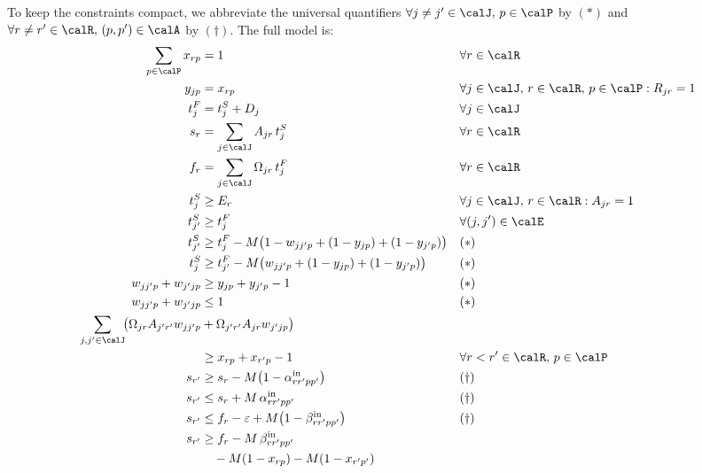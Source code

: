 To keep the constraints compact, we abbreviate the universal quantifiers
$\forall j \ne j' \in \calJ,\, p \in \calP$ by $(\ast)$ and
$\forall r \ne r' \in \calR,\, (p, p') \in \calA$ by $(\dagger)$.
The full model is:
\begin{align}
  \sum_{p \in \calP} x_{rp} &= 1
    && \forall r \in \calR \label{eq:assign}\\
  y_{jp} &= x_{rp}
    && \forall j \in \calJ,\, r \in \calR,\, p \in \calP : R_{jr} = 1
    \label{eq:linkage}\\
  t^F_j &= t^S_j + D_j
    && \forall j \in \calJ \label{eq:finish}\\
  s_r &= \sum_{j \in \calJ} A_{jr}\, t^S_j
    && \forall r \in \calR \label{eq:srdef}\\
  f_r &= \sum_{j \in \calJ} \Omega_{jr}\, t^F_j
    && \forall r \in \calR \label{eq:frdef}\\
  t^S_j &\ge E_r
    && \forall j \in \calJ,\, r \in \calR : A_{jr} = 1
    \label{eq:earlystart}\\
  t^S_{j'} &\ge t^F_j
    && \forall (j, j') \in \calE \label{eq:prec}\\
  t^S_{j'} &\ge t^F_j
              - M\bigl(1 - w_{jj'p} + (1 - y_{jp}) + (1 - y_{j'p})\bigr)
    && (\ast) \label{eq:nonov1}\\
  t^S_{j}  &\ge t^F_{j'}
              - M\bigl(w_{jj'p} + (1 - y_{jp}) + (1 - y_{j'p})\bigr)
    && (\ast) \label{eq:nonov2}\\
  w_{jj'p} + w_{j'jp} &\ge y_{jp} + y_{j'p} - 1
    && (\ast) \label{eq:nonov3}\\
  w_{jj'p} + w_{j'jp} &\le 1
    && (\ast) \label{eq:nonov4}\\
  \sum_{j, j' \in \calJ}\!
    \bigl(\Omega_{jr} A_{j'r'} w_{jj'p}
        &+ \Omega_{j'r'} A_{jr} w_{j'jp}\bigr) \notag\\
    &\ge x_{rp} + x_{r'p} - 1
    && \forall r < r' \in \calR,\, p \in \calP \label{eq:nonov-ac}\\
  s_{r'} &\ge s_r - M\bigl(1 - \alpha^{\mathrm{in}}_{rr'pp'}\bigr)
    && (\dagger) \label{eq:alphaInLB}\\
  s_{r'} &\le s_r + M\,\alpha^{\mathrm{in}}_{rr'pp'}
    && (\dagger) \label{eq:alphaInUB}\\
  s_{r'} &\le f_r - \varepsilon
              + M\bigl(1 - \beta^{\mathrm{in}}_{rr'pp'}\bigr)
    && (\dagger) \label{eq:betaInUB}\\
  s_{r'} &\ge f_r - M\,\beta^{\mathrm{in}}_{rr'pp'} \notag\\
         &\quad - M(1 - x_{rp}) - M(1 - x_{r'p'})

\end{align}
